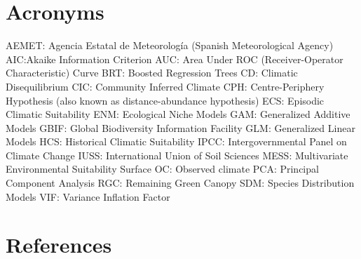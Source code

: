 \documentclass[11pt,twoside]{reedthesis}
\begin{document}
\chapter*{Acronyms}\label{acronyms}

AEMET: Agencia Estatal de Meteorología (Spanish Meteorological
Agency)\newline
AIC:Akaike Information Criterion\newline
AUC: Area Under ROC (Receiver-Operator Characteristic) Curve\newline
BRT: Boosted Regression Trees\newline
CD: Climatic Disequilibrium\newline
CIC: Community Inferred Climate\newline
CPH: Centre-Periphery Hypothesis (also known as distance-abundance
hypothesis)\newline
ECS: Episodic Climatic Suitability\newline
ENM: Ecological Niche Models\newline
GAM: Generalized Additive Models\newline
GBIF: Global Biodiversity Information Facility\newline
GLM: Generalized Linear Models\newline
HCS: Historical Climatic Suitability\newline
IPCC: Intergovernmental Panel on Climate Change\newline
IUSS: International Union of Soil Sciences\newline
MESS: Multivariate Environmental Suitability Surface\newline
OC: Observed climate\newline
PCA: Principal Component Analysis\newline
RGC: Remaining Green Canopy\newline
SDM: Species Distribution Models\newline
VIF: Variance Inflation Factor\newline

\chapter*{References}\label{references}

\setlength{\parindent}{-0.20in} \setlength{\leftskip}{0.20in}
\setlength{\parskip}{8pt}
\end{document}
